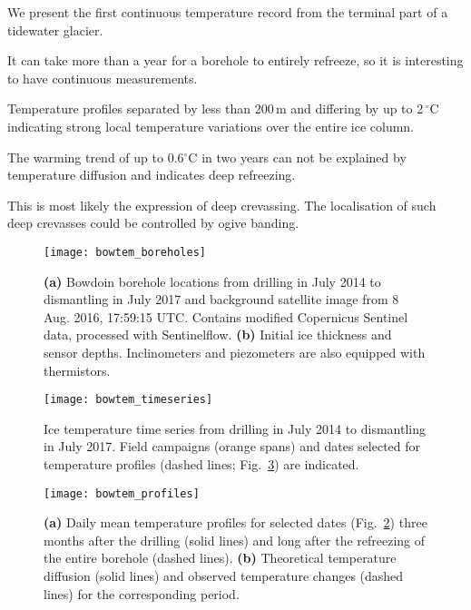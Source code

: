 \documentclass[utf8]{article}
\begin{document}
    We present the first continuous temperature record from the terminal part
    of a tidewater glacier.

    It can take more than a year for a borehole to entirely refreeze, so it is
    interesting to have continuous measurements.

    Temperature profiles separated by less than 200\,m and differing by up to
    2\,$^\circ$C indicating strong local temperature variations over the
    entire ice column.

    The warming trend of up to 0.6$^\circ$C in two years can not be explained
    by temperature diffusion and indicates deep refreezing.

    This is most likely the expression of deep crevassing. The localisation of
    such deep crevasses could be controlled by ogive banding.


\clearpage

    \begin{figure}
      \centerline{\texttt{[image: bowtem\_boreholes]}}
      \caption{\textbf{(a)} Bowdoin borehole locations from drilling in July
               2014 to dismantling in July 2017 and background satellite
               image from 8 Aug. 2016, 17:59:15 UTC. Contains modified
               Copernicus Sentinel data, processed with Sentinelflow.
               \textbf{(b)} Initial ice thickness and sensor depths.
               Inclinometers and piezometers are also equipped with
               thermistors.}
      \label{fig:boreholes}
    \end{figure}

    \begin{figure}
      \centerline{\texttt{[image: bowtem\_timeseries]}}
      \caption{Ice temperature time series from drilling in July 2014 to
               dismantling in July 2017. Field campaigns (orange spans) and
               dates selected for temperature profiles (dashed lines;
               Fig.~\ref{fig:profiles}) are indicated.}
      \label{fig:timeseries}
    \end{figure}

    \begin{figure}
      \centerline{\texttt{[image: bowtem\_profiles]}}
      \caption{\textbf{(a)} Daily mean temperature profiles for selected dates
               (Fig.~\ref{fig:timeseries}) three months after the drilling
               (solid lines) and long after the refreezing of the entire
               borehole (dashed lines).
               \textbf{(b)} Theoretical temperature diffusion (solid lines) and
               observed temperature changes (dashed lines) for the
               corresponding period.}
      \label{fig:profiles}
    \end{figure}
\end{document}
